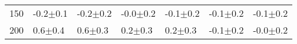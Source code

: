 \begin{tabular}{lllllll}
150 & {\cellcolor[HTML]{D2D2D2}} \color[HTML]{000000} -0.2$\pm$0.1 & {\cellcolor[HTML]{B8B8B8}} \color[HTML]{000000} -0.2$\pm$0.2 & {\cellcolor[HTML]{989898}} \color[HTML]{F1F1F1} -0.0$\pm$0.2 & {\cellcolor[HTML]{AFAFAF}} \color[HTML]{000000} -0.1$\pm$0.2 & {\cellcolor[HTML]{AAAAAA}} \color[HTML]{F1F1F1} -0.1$\pm$0.2 & {\cellcolor[HTML]{B8B8B8}} \color[HTML]{000000} -0.1$\pm$0.2 \\
200 & {\cellcolor[HTML]{CFCFCF}} \color[HTML]{000000} 0.6$\pm$0.4 & {\cellcolor[HTML]{D8D8D8}} \color[HTML]{000000} 0.6$\pm$0.3 & {\cellcolor[HTML]{A3A3A3}} \color[HTML]{F1F1F1} 0.2$\pm$0.3 & {\cellcolor[HTML]{AAAAAA}} \color[HTML]{F1F1F1} 0.2$\pm$0.3 & {\cellcolor[HTML]{A4A4A4}} \color[HTML]{F1F1F1} -0.1$\pm$0.2 & {\cellcolor[HTML]{999999}} \color[HTML]{F1F1F1} -0.0$\pm$0.2 \\
\end{tabular}
